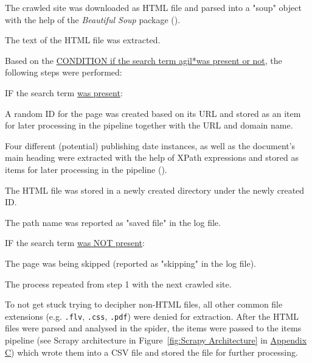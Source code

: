 \begin{compactenum}
    \setlength
    \itemsep{0em}
        \item The crawled site was downloaded as HTML file and parsed into a "soup" object with the help of the \textit{Beautiful Soup} package (\cite{Richardson2007}).
        \item The text of the HTML file was extracted.
        \item Based on the \underline{CONDITION if the search term agil*\footnotemark  was present or not}, the following steps were performed: 
        \begin{compactenum}
            \item IF the search term \underline{was present}:
            \begin{compactenum}
                \item A random ID for the page was created  based on its URL and stored as an item for later processing in the pipeline together with the URL and domain name.
                \item Four different (potential) publishing date instances, as well as the document's main heading were extracted with the help of XPath expressions and stored as items for later processing in the pipeline (\cite{W3schools.com2020}).
                \item The HTML file was stored in a newly created directory under the newly created ID.
                \item The path name was reported as "saved file" in the log file. 
            \end{compactenum}
            \item IF the search term \underline{was NOT present}:
            \begin{compactenum}
                \item The page was being skipped (reported as "skipping" in the log file).
            \end{compactenum}
        \end{compactenum}
        \item The process repeated from step 1 with the next crawled site. 
\end{compactenum}
To not get stuck trying to decipher non-HTML files, all other common file extensions (e.g. \texttt{.flv}, \texttt{.css}, \texttt{.pdf}) were denied for extraction. After the HTML files were parsed and analysed in the spider, the items were passed to the items pipeline (see Scrapy architecture in Figure~\ref{fig:Scrapy Architecture} in \hyperref[Appendix C]{Appendix C}) which wrote them into a CSV file and stored the file for further processing.

